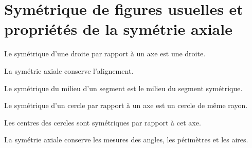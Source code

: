 \documentclass[a4paper,10pt]{report}
\begin{document}
\section{Symétrique de figures usuelles et propriétés de la symétrie axiale}

\begin{prop}
Le symétrique d'une droite par rapport à un axe est une droite.

\medskip
\noindent La symétrie axiale conserve l'alignement.
\end{prop}

\begin{rem}
Le symétrique du milieu d'un segment est le milieu du segment symétrique.
\end{rem}

\begin{prop}
Le symétrique d'un cercle par rapport à un axe est un cercle de même rayon.

\medskip
\noindent Les centres des cercles sont symétriques par rapport à cet axe.
\end{prop}

\begin{prop}
La symétrie axiale conserve les mesures des angles, les périmètres et les aires.
\end{prop}
\end{document}
